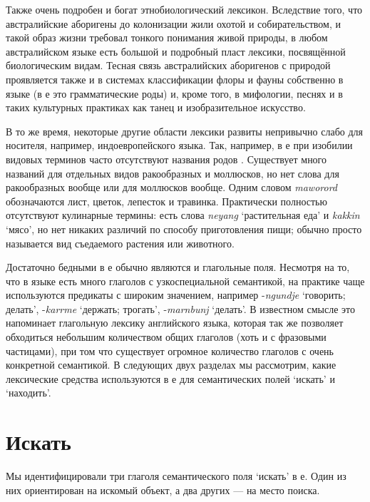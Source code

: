Также очень подробен и богат этнобиологический лексикон. Вследствие того, что австралийские аборигены до колонизации жили охотой и собирательством, и такой образ жизни требовал тонкого понимания живой природы, в любом австралийском языке есть большой и подробный пласт лексики, посвящённой биологическим видам. Тесная связь австралийских аборигенов с природой проявляется также и в системах классификации флоры и фауны собственно в языке (в  е это грамматические роды) и, кроме того, в мифологии, песнях и в таких культурных практиках как танец и изобразительное искусство.

В то же время, некоторые другие области лексики развиты непривычно слабо для носителя, например, индоевропейского языка. Так, например, в  е при изобилии видовых терминов часто отсутствуют названия родов \autocite[Об этом в австралийских языках вообще см.][\S2.1, и цитируемые там источники]{gabysinger14}. Существует много названий для отдельных видов ракообразных и моллюсков, но нет слова для ракообразных вообще или для моллюсков вообще. Одним словом \textit{maworord} обозначаются лист, цветок, лепесток и травинка. Практически полностью отсутствуют кулинарные термины: есть слова \textit{neyang} `растительная еда' и \textit{kakkin} `мясо', но нет никаких различий по способу приготовления пищи; обычно просто называется вид съедаемого растения или животного.

Достаточно бедными в  е обычно являются и глагольные поля.
Несмотря на то, что в языке есть много глаголов с узкоспециальной семантикой, на практике чаще используются предикаты с широким значением, например -\textit{ngundje} `говорить; делать', -\textit{karrme} `держать; трогать', -\textit{marnbunj} `делать'. В известном смысле это напоминает глагольную лексику английского языка, которая так же позволяет обходиться небольшим количеством общих глаголов (хоть и с фразовыми частицами), при том что существует огромное количество глаголов с очень конкретной семантикой. В следующих двух разделах мы рассмотрим, какие лексические средства используются в  е для семантических полей `искать' и `находить'.

\section{Искать}
\label{sec:search}
Мы идентифицировали три глаголя семантического поля `искать' в  е. Один из них ориентирован на искомый объект, а два других --- на место поиска.
